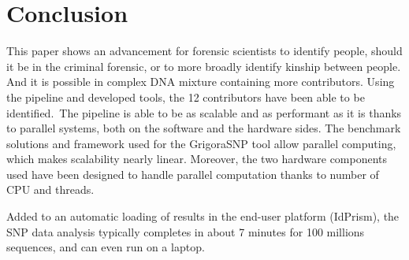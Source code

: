 \documentclass[../main.tex]{subfiles}
\begin{document}
\section{Conclusion}

This paper shows an advancement for forensic scientists to identify people, should it be in the criminal forensic, or to more broadly identify kinship between people. And it is possible in complex DNA mixture containing more contributors. Using the pipeline and developed tools, the 12 contributors have been able to be identified.\  
The pipeline is able to be as scalable and as performant as it is thanks to parallel systems, both on the software and the hardware sides. The benchmark solutions and framework used for the GrigoraSNP tool allow parallel computing, which makes scalability nearly linear. Moreover, the two hardware components used have been designed to handle parallel computation thanks to number of CPU and threads.

Added to an automatic loading of results in the end-user platform (IdPrism), the SNP data analysis typically completes in about 7 minutes for 100 millions sequences, and can even run on a laptop.
\end{document}
